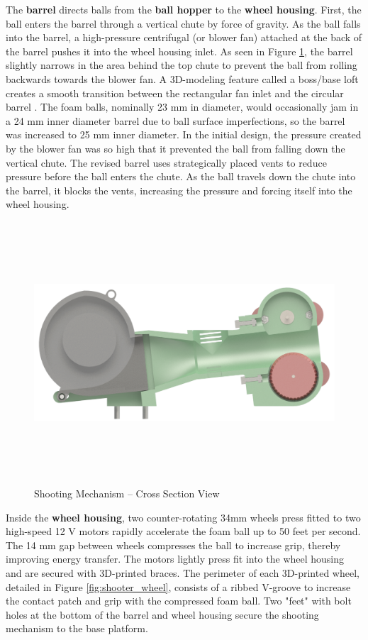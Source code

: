 The \textbf{barrel} directs balls from the \textbf{ball hopper} to the \textbf{wheel housing}. First, the ball enters the barrel through a vertical chute by force of gravity. As the ball falls into the barrel, a high-pressure centrifugal (or blower fan) attached at the back of the barrel pushes it into the wheel housing inlet. As seen in Figure \ref{fig:shooter_xsec}, the barrel slightly narrows in the area behind the top chute to prevent the ball from rolling backwards towards the blower fan. A 3D-modeling feature called a boss/base loft creates a smooth transition between the rectangular fan inlet and the circular barrel \cite{zuyderduyn_2016}. The foam balls, nominally 23 mm in diameter, would occasionally jam in a 24 mm inner diameter barrel due to ball surface imperfections, so the barrel was increased to 25 mm inner diameter. In the initial design, the pressure created by the blower fan was so high that it prevented the ball from falling down the vertical chute. The revised barrel uses strategically placed vents to reduce pressure before the ball enters the chute. As the ball travels down the chute into the barrel, it blocks the vents, increasing the pressure and forcing itself into the wheel housing.

\begin{figure}[H]   %
	\centering \includegraphics[width=6in, height=3.85in, keepaspectratio]{figures/shooter_xsec.png}
	\caption{Shooting Mechanism -- Cross Section View}	\label{fig:shooter_xsec}
\end{figure}

Inside the \textbf{wheel housing}, two counter-rotating 34mm wheels press fitted to two high-speed 12 V motors rapidly accelerate the foam ball up to 50 feet per second. The 14 mm gap between wheels compresses the ball to increase grip, thereby improving energy transfer. The motors lightly press fit into the wheel housing and are secured with 3D-printed braces. The perimeter of each 3D-printed wheel, detailed in Figure \ref{fig:shooter_wheel}, consists of a ribbed V-groove to increase the contact patch and grip with the compressed foam ball. Two "feet" with bolt holes at the bottom of the barrel and wheel housing secure the shooting mechanism to the base platform.

